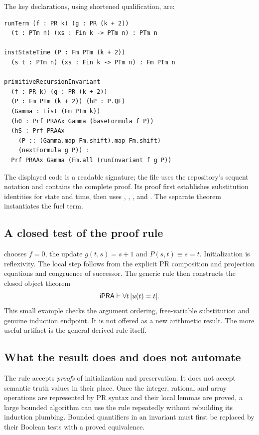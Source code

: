 The key declarations, using shortened qualification, are:
\begin{lstlisting}
runTerm (f : PR k) (g : PR (k + 2))
  (t : PTm n) (xs : Fin k -> PTm n) : PTm n

instStateTime (P : Fm PTm (k + 2))
  (s t : PTm n) (xs : Fin k -> PTm n) : Fm PTm n

primitiveRecursionInvariant
  (f : PR k) (g : PR (k + 2))
  (P : Fm PTm (k + 2)) (hP : P.QF)
  (Gamma : List (Fm PTm k))
  (h0 : Prf PRAAx Gamma (baseFormula f P))
  (hS : Prf PRAAx
    (P :: (Gamma.map Fm.shift).map Fm.shift)
    (nextFormula g P)) :
  Prf PRAAx Gamma (Fm.all (runInvariant f g P))
\end{lstlisting}
The displayed code is a readable signature; the file uses the repository's
sequent notation and contains the complete proof. Its proof first establishes
substitution identities for state and time, then uses
, , ,
 and . The separate theorem
 instantiates the fuel term.

\subsection{A closed test of the proof rule}

 chooses $f=0$, the update $g(t,s)=s+1$ and
$P(s,t)\equiv s=t$. Initialization is reflexivity. The local step follows
from the explicit PR composition and projection equations and congruence
of successor. The generic rule then constructs the closed object theorem
\[
 \mathsf{iPRA}\vdash\forall t\,[u(t)=t].
\]
This small example checks the argument ordering, free-variable substitution
and genuine induction endpoint. It is not offered as a new arithmetic
result. The more useful artifact is the general derived rule itself.

\subsection{What the result does and does not automate}

The rule accepts \emph{proofs} of initialization and preservation. It does
not accept semantic truth values in their place. Once the integer, rational
and array operations are represented by PR syntax and their local lemmas
are proved, a large bounded algorithm can use the rule repeatedly without
rebuilding its induction plumbing. Bounded quantifiers in an invariant must
first be replaced by their Boolean tests with a proved equivalence.

